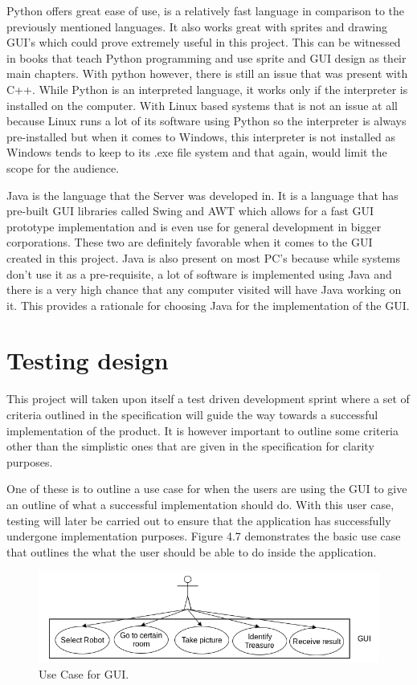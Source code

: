         Python offers great ease of use, is a relatively fast language in comparison to the previously mentioned languages. It also works great with sprites and drawing GUI’s which could prove extremely useful in this project. This can be witnessed in books that teach Python programming and use sprite and GUI design as their main chapters\cite{python}. With python however, there is still an issue that was present with C++. While Python is an interpreted language, it works only if the interpreter is installed on the computer. With Linux based systems that is not an issue at all because Linux runs a lot of its software using Python so the interpreter is always pre-installed but when it comes to Windows, this interpreter is not installed as Windows tends to keep to its .exe file system and that again, would limit the scope for the audience.

        Java is the language that the Server was developed in. It is a language that has pre-built GUI libraries called Swing and AWT which allows for a fast GUI prototype implementation and is even use for general development in bigger corporations. These two are definitely favorable when it comes to the GUI created in this project. Java is also present on most PC’s because while systems don't use it as a pre-requisite, a lot of software is implemented using Java and there is a very high chance that any computer visited will have Java working on it. This provides a rationale for choosing Java for the implementation of the GUI.

    \section{Testing design}
      This project will taken upon itself a test driven development sprint where a set of criteria outlined in the specification will guide the way towards a successful implementation of the product. It is however important to outline some criteria other than the simplistic ones that are given in the specification for clarity purposes.

      One of these is to outline a use case for when the users are using the GUI to give an outline of what a successful implementation should do. With this user case, testing will later be carried out to ensure that the application has successfully undergone implementation purposes. Figure 4.7 demonstrates the basic use case that outlines the what the user should be able to do inside the application.

        \begin{figure}[!ht]  
          \centering
            \includegraphics[width=1\textwidth]{figures/GuiUseCase2.png}
            \caption{Use Case for GUI.}
        \end{figure}

